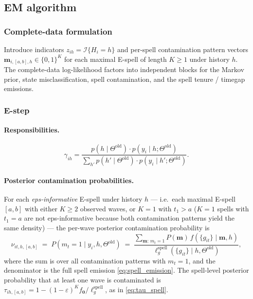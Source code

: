 \subsection{EM algorithm}

\subsubsection{Complete-data formulation}

Introduce indicators \(z_{ih} = \mathcal{I}\{H_i = h\}\) and per-spell
contamination pattern vectors \(\mathbf{m}_{i,[a,b],h} \in \{0,1\}^K\) for
each maximal E-spell of length \(K \ge 1\) under history \(h\).
The complete-data log-likelihood factors into independent blocks for
the Markov prior, state misclassification, spell contamination, and the
spell tenure / timegap emissions.

\subsubsection{E-step}

\paragraph{Responsibilities.}
\begin{equation}
\gamma_{ih} = \frac{p(h \mid \Theta^{\mathrm{old}}) \cdot p(y_i \mid h; \Theta^{\mathrm{old}})}{\sum_{h'} p(h' \mid \Theta^{\mathrm{old}}) \cdot p(y_i \mid h'; \Theta^{\mathrm{old}})}.
\end{equation}

\paragraph{Posterior contamination probabilities.}
For each \emph{eps-informative} E-spell under history \(h\) --- i.e.\ each
maximal E-spell \([a,b]\) with either \(K \ge 2\) observed waves, or
\(K = 1\) with \(t_1 > a\) (\(K=1\) spells with \(t_1 = a\) are not
eps-informative because both contamination patterns yield the same density)
--- the per-wave posterior contamination probability is
\begin{equation}
\nu_{it,h,[a,b]} \;=\; P(m_t = 1 \mid y_i, h, \Theta^{\mathrm{old}})
\;=\;
\frac{\sum_{\mathbf{m}:\, m_t = 1}\!
P(\mathbf{m})\, f(\{g_{it}\} \mid \mathbf{m}, h)}
{\ell^{\mathrm{spell}}_g(\{g_{it}\} \mid h, \Theta^{\mathrm{old}})},
\end{equation}
where the sum is over all contamination patterns with \(m_t = 1\), and
the denominator is the full spell emission \eqref{eq:spell_emission}.
The spell-level posterior probability that at least one wave is
contaminated is
\(\tau_{ih,[a,b]} = 1 - (1-\varepsilon)^K f_{\mathbf{0}} /
\ell^{\mathrm{spell}}_g\),
as in \eqref{eq:tau_spell}.

